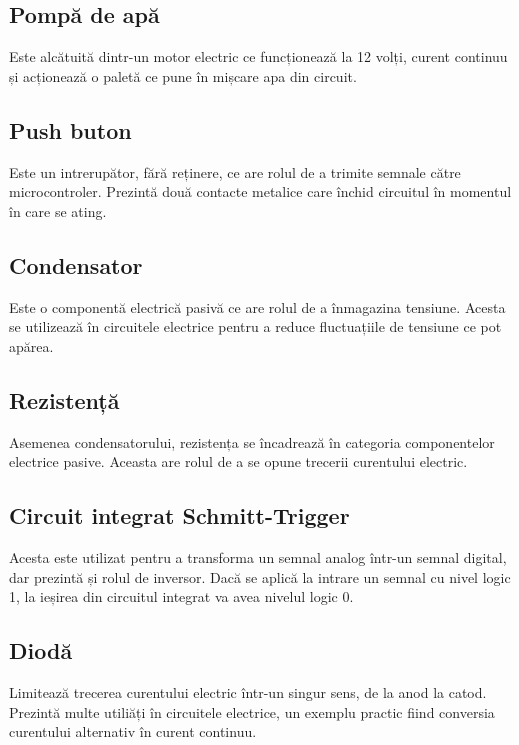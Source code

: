 \subsection{Pompă de apă}

	Este alcătuită dintr-un motor electric ce funcționează la 12 volți, curent continuu și acționează o paletă ce pune în mișcare apa din circuit.   

\subsection{Push buton}

	Este un intrerupător, fără reținere, ce are rolul de a trimite semnale către microcontroler. Prezintă două contacte metalice care închid circuitul în momentul în care se ating. 

\subsection{Condensator}

	Este o componentă electrică pasivă ce are rolul de a înmagazina tensiune. Acesta se utilizează în circuitele electrice pentru a reduce fluctuațiile de tensiune ce pot apărea.

\subsection{Rezistență}

	Asemenea condensatorului, rezistența se încadrează în categoria componentelor electrice pasive. Aceasta are rolul de a se opune trecerii curentului electric. 

\subsection{Circuit integrat Schmitt-Trigger}

	Acesta este utilizat pentru a transforma un semnal analog într-un semnal digital, dar prezintă și rolul de inversor. Dacă se aplică la intrare un semnal cu nivel logic 1, la ieșirea din circuitul integrat va avea nivelul logic 0.

\subsection{Diodă}

	Limitează trecerea curentului electric într-un singur sens, de la anod la catod. Prezintă multe utiliăți în circuitele electrice, un exemplu practic fiind conversia curentului alternativ în curent continuu. 

